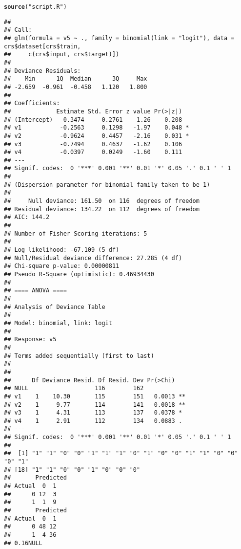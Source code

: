 \documentclass{article}\usepackage[]{graphicx}\usepackage[]{color}
\makeatletter
\newcommand{\hlstr}[1]{\textcolor[rgb]{0.192,0.494,0.8}{#1}}%
\newcommand{\hlkwd}[1]{\textcolor[rgb]{0.737,0.353,0.396}{\textbf{#1}}}%
\newenvironment{kframe}{%
 \def\at@end@of@kframe{}%
 \ifinner\ifhmode%
  \def\at@end@of@kframe{\end{minipage}}%
  \begin{minipage}{\columnwidth}%
 \fi\fi%
 \def\FrameCommand##1{\hskip\@totalleftmargin \hskip-\fboxsep
 \colorbox{shadecolor}{##1}\hskip-\fboxsep
     \hskip-\linewidth \hskip-\@totalleftmargin \hskip\columnwidth}%
 \MakeFramed {\advance\hsize-\width
   \@totalleftmargin\z@ \linewidth\hsize
   \@setminipage}}%
 {\par\unskip\endMakeFramed%
 \at@end@of@kframe}
\newenvironment{knitrout}{}{} %
\makeatother
\begin{document}
\begin{knitrout}
\color{fgcolor}\begin{kframe}
\begin{alltt}
\hlkwd{source}(\hlstr{"script.R"})
\end{alltt}


{\ttfamily\noindent\itshape\color{messagecolor}{\#\# Rattle: A free graphical interface for data mining with R.\\\#\# Version 2.6.26 r77 Copyright (c) 2006-2013 Togaware Pty Ltd.\\\#\# Type 'rattle()' to shake, rattle, and roll your data.}}\begin{verbatim}
## 
## Call:
## glm(formula = v5 ~ ., family = binomial(link = "logit"), data = crs$dataset[crs$train, 
##     c(crs$input, crs$target)])
## 
## Deviance Residuals: 
##    Min      1Q  Median      3Q     Max  
## -2.659  -0.961  -0.458   1.120   1.800  
## 
## Coefficients:
##             Estimate Std. Error z value Pr(>|z|)  
## (Intercept)   0.3474     0.2761    1.26    0.208  
## v1           -0.2563     0.1298   -1.97    0.048 *
## v2           -0.9624     0.4457   -2.16    0.031 *
## v3           -0.7494     0.4637   -1.62    0.106  
## v4           -0.0397     0.0249   -1.60    0.111  
## ---
## Signif. codes:  0 '***' 0.001 '**' 0.01 '*' 0.05 '.' 0.1 ' ' 1 
## 
## (Dispersion parameter for binomial family taken to be 1)
## 
##     Null deviance: 161.50  on 116  degrees of freedom
## Residual deviance: 134.22  on 112  degrees of freedom
## AIC: 144.2
## 
## Number of Fisher Scoring iterations: 5
## 
## Log likelihood: -67.109 (5 df)
## Null/Residual deviance difference: 27.285 (4 df)
## Chi-square p-value: 0.00000811
## Pseudo R-Square (optimistic): 0.46934430
## 
## ==== ANOVA ====
## 
## Analysis of Deviance Table
## 
## Model: binomial, link: logit
## 
## Response: v5
## 
## Terms added sequentially (first to last)
## 
## 
##      Df Deviance Resid. Df Resid. Dev Pr(>Chi)   
## NULL                   116        162            
## v1    1    10.30       115        151   0.0013 **
## v2    1     9.77       114        141   0.0018 **
## v3    1     4.31       113        137   0.0378 * 
## v4    1     2.91       112        134   0.0883 . 
## ---
## Signif. codes:  0 '***' 0.001 '**' 0.01 '*' 0.05 '.' 0.1 ' ' 1 
## 
##  [1] "1" "1" "0" "0" "1" "1" "1" "0" "1" "0" "0" "1" "1" "0" "0" "0" "1"
## [18] "1" "1" "0" "0" "1" "0" "0" "0"
##       Predicted
## Actual  0  1
##      0 12  3
##      1  1  9
##       Predicted
## Actual  0  1
##      0 48 12
##      1  4 36
## 0.16NULL
\end{verbatim}



\end{kframe}
\end{knitrout}
\end{document}
